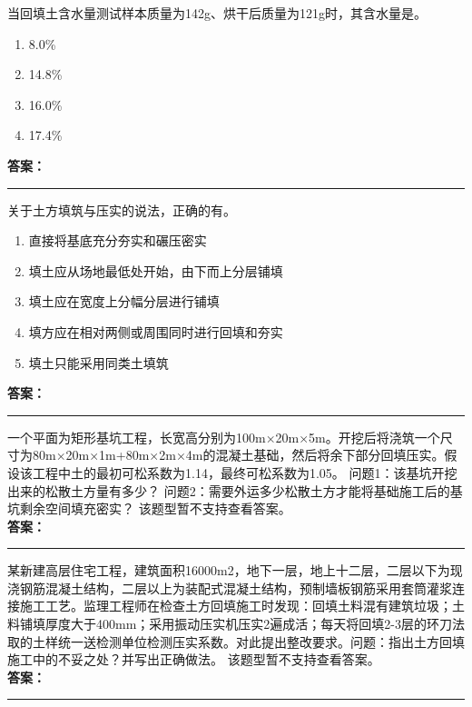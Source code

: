 \documentclass[UTF8,fontset=fandol,11pt]{ctexart}
\newcommand{\answerline}{\textcolor{answerred}{\rule{2.4cm}{0.7pt}}}
\begin{document}
\begin{quizbox}[title={第 31 题}]
当回填土含水量测试样本质量为142g、烘干后质量为121g时，其含水量是。\\
\begin{enumerate}[label=\Alph*.]
\item 8.0\%
\item 14.8\%
\item 16.0\%
\item 17.4\%
\end{enumerate}
\textbf{\textcolor{answerred}{答案：}} \answerline
\end{quizbox}

\begin{quizbox}[title={第 32 题}]
关于土方填筑与压实的说法，正确的有。\\
\begin{enumerate}[label=\Alph*.]
\item 直接将基底充分夯实和碾压密实
\item 填土应从场地最低处开始，由下而上分层铺填
\item 填土应在宽度上分幅分层进行铺填
\item 填方应在相对两侧或周围同时进行回填和夯实
\item 填土只能采用同类土填筑
\end{enumerate}
\textbf{\textcolor{answerred}{答案：}} \answerline
\end{quizbox}

\begin{quizbox}[title={第 33 题}]
一个平面为矩形基坑工程，长宽高分别为100m×20m×5m。开挖后将浇筑一个尺寸为80m×20m×1m+80m×2m×4m的混凝土基础，然后将余下部分回填压实。假设该工程中土的最初可松系数为1.14，最终可松系数为1.05。 问题1：该基坑开挖出来的松散土方量有多少？ 问题2：需要外运多少松散土方才能将基础施工后的基坑剩余空间填充密实？ 该题型暂不支持查看答案。\\
\textbf{\textcolor{answerred}{答案：}} \answerline
\end{quizbox}

\begin{quizbox}[title={第 34 题}]
某新建高层住宅工程，建筑面积16000m2，地下一层，地上十二层，二层以下为现浇钢筋混凝土结构，二层以上为装配式混凝土结构，预制墙板钢筋采用套筒灌浆连接施工工艺。监理工程师在检查土方回填施工时发现：回填土料混有建筑垃圾；土料铺填厚度大于400mm；采用振动压实机压实2遍成活；每天将回填2-3层的环刀法取的土样统一送检测单位检测压实系数。对此提出整改要求。问题：指出土方回填施工中的不妥之处？并写出正确做法。 该题型暂不支持查看答案。\\
\textbf{\textcolor{answerred}{答案：}} \answerline
\end{quizbox}
\end{document}
